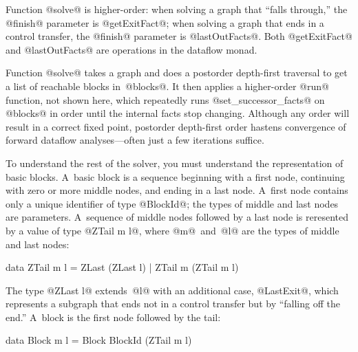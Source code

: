  
Function @solve@ is higher-order: 
when solving a graph that ``falls through,'' 
the @finish@ parameter is @getExitFact@;
when solving a graph that ends in a control transfer,
the @finish@ parameter is @lastOutFacts@. 
Both @getExitFact@ and @lastOutFacts@ are operations in the dataflow
monad.

Function @solve@ takes a graph and does a postorder depth-first traversal 
to get a list of reachable blocks in~@blocks@.  
It then applies a higher-order @run@ function,
not shown here,
which repeatedly runs
@set_successor_facts@ on @blocks@ in order until the internal facts
stop changing.
Although any order will result in a correct fixed point,
postorder depth-first order hastens convergence of forward dataflow
analyses---often just a few iterations suffice.



To understand the rest of the solver, you must understand the
representation of basic blocks.
A~basic block is a sequence beginning with a first node, continuing
with zero or more middle nodes, and ending in a last node.
A~first node contains only a unique identifier of type @BlockId@; the
types of middle and last nodes are parameters.
A~sequence of middle nodes followed by a last node is reresented by a
value of type @ZTail m l@, where @m@~and~@l@
are the types of middle and last nodes:
\begin{code}
data ZTail m l = ZLast (ZLast l) | ZTail m (ZTail m l)
\end{code}
The type @ZLast l@ extends~@l@ with an additional case, @LastExit@,
which represents a subgraph that ends not in a control transfer but by
``falling off the end.''
A~block is the first node followed by the tail:
\begin{code}
data Block m l = Block BlockId (ZTail m l)
\end{code}

